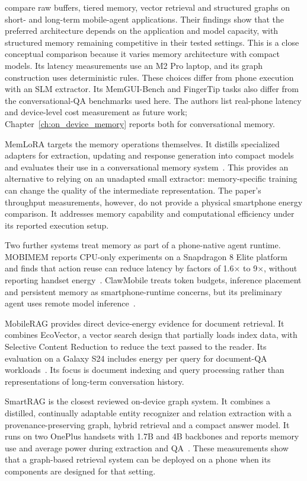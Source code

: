 \citet{mobile_memory_architectures} compare raw buffers, tiered memory, vector retrieval
and structured graphs on short- and long-term mobile-agent applications. Their findings
show that the preferred architecture depends on the application and model capacity, with
structured memory remaining competitive in their tested settings. This is a close
conceptual comparison because it varies memory architecture with compact models. Its
latency measurements use an M2 Pro laptop, and its graph construction uses deterministic
rules. These choices differ from phone execution with an SLM extractor. Its MemGUI-Bench
and FingerTip tasks also differ from the conversational-QA benchmarks used here. The
authors list real-phone latency and device-level cost measurement as future work;
Chapter~\ref{ch:on_device_memory} reports both for conversational memory.

MemLoRA targets the memory operations themselves. It distills specialized adapters for
extraction, updating and response generation into compact models and evaluates their use
in a conversational memory system~\citep{memlora}. This provides an alternative to relying
on an unadapted small extractor: memory-specific training can change the quality of the
intermediate representation. The paper's throughput measurements, however, do not provide
a physical smartphone energy comparison. It addresses memory capability and computational
efficiency under its reported execution setup.

Two further systems treat memory as part of a phone-native agent runtime. MOBIMEM reports
CPU-only experiments on a Snapdragon 8 Elite platform and finds that action reuse can
reduce latency by factors of 1.6$\times$ to 9$\times$, without reporting handset
energy~\citep{mobimem}. ClawMobile treats token budgets, inference placement and persistent
memory as smartphone-runtime concerns, but its preliminary agent uses remote model
inference~\citep{clawmobile}.

MobileRAG provides direct device-energy evidence for document retrieval. It combines
EcoVector, a vector search design that partially loads index data, with Selective Content
Reduction to reduce the text passed to the reader. Its evaluation on a Galaxy S24 includes
energy per query for document-QA workloads~\citep{mobilerag_energy}. Its focus is document
indexing and query processing rather than representations of long-term conversation history.

SmartRAG is the closest reviewed on-device graph system. It combines a distilled,
continually adaptable entity recognizer and relation extraction with a provenance-preserving
graph, hybrid retrieval and a compact answer model. It runs on two OnePlus handsets with
1.7B and 4B backbones and reports memory use and average power during extraction and
QA~\citep{smartrag}. These measurements show that a graph-based retrieval system can be
deployed on a phone when its components are designed for that setting.

